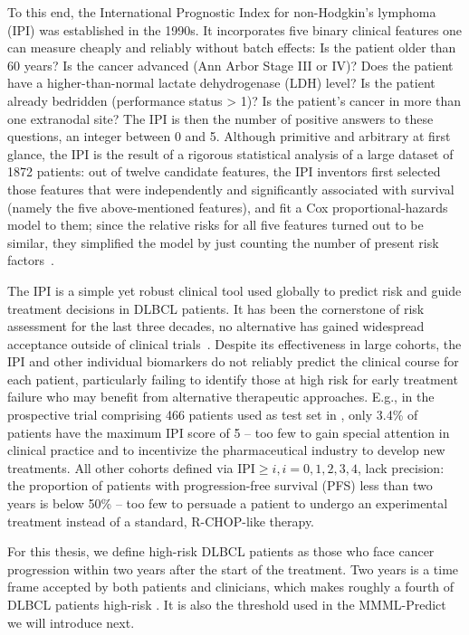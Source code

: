 To this end, the International Prognostic Index for non-Hodgkin's lymphoma (IPI) was established in 
the 1990s. It incorporates five binary clinical features one can measure cheaply and 
reliably without batch effects: Is the patient older than \num{60} years? Is the cancer advanced 
(Ann Arbor Stage III or IV)? Does the patient have a higher-than-normal lactate dehydrogenase (LDH) 
level? Is the patient already 
bedridden (performance status > 1)? Is the patient's cancer in more than one extranodal site? The 
IPI is then the number of positive answers to these questions, an integer between 0 and 5. Although 
primitive and arbitrary at first glance, the IPI is the result of a rigorous statistical analysis 
of a large dataset of \num{1872} patients: out of twelve candidate features, the IPI inventors
first selected those features that were independently and significantly associated with survival 
(namely the five above-mentioned features), and fit a Cox proportional-hazards model to them;
since the relative risks for all five features turned out to be similar, they simplified the model 
by just counting the number of present risk factors~\cite{ipi93}. 

The IPI is a simple yet robust clinical tool used globally to predict risk and guide 
treatment decisions in DLBCL patients. It has been the cornerstone of risk assessment for the last 
three decades, no alternative has gained widespread acceptance outside of clinical 
trials~\citep{ipi-stay-strong}. 
Despite its effectiveness in large cohorts, the IPI and other individual 
biomarkers do not reliably predict the clinical course for each patient, particularly failing to 
identify those at high risk for early treatment failure who may benefit from alternative therapeutic 
approaches. E.g., in the prospective trial comprising \num{466} patients used as test set in 
\citep{staiger20}, only \num{3.4}\% of patients have the maximum IPI score of 5 -- too few
to gain special attention in clinical practice and to incentivize the pharmaceutical industry to 
develop new treatments. All other cohorts defined via $\text{IPI} \geq i, i = 0, 1, 2, 3, 4$, lack 
precision: the proportion of patients with progression-free survival (PFS) less than two years is below 
\num{50}\% -- too few to persuade a patient to undergo an experimental treatment instead of a 
standard, R-CHOP-like therapy.

For this thesis, we define high-risk DLBCL patients as those who face cancer progression 
within two years after the start of the treatment. Two years is a time frame accepted by both 
patients and clinicians, which makes roughly a fourth of DLBCL patients high-risk \cite{staiger20}.
It is also the threshold used in the MMML-Predict we will introduce next.

